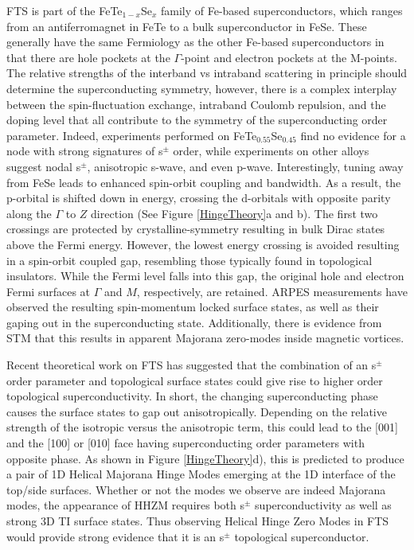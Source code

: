 \par
FTS is part of the FeTe$_{1-x}$Se$_{x}$ family of Fe-based superconductors, which ranges from an antiferromagnet in FeTe to a bulk superconductor in FeSe\cite{Liu2010}. These generally have the same Fermiology as the other Fe-based superconductors in that there are hole pockets at the $\Gamma$-point and electron pockets at the M-points\cite{Homes2015,Hanaguri2010,Miao2012,Okazaki2012,Zhang2018}. The relative strengths of the interband vs intraband scattering in principle should determine the superconducting symmetry, however, there is a complex interplay between the spin-fluctuation exchange, intraband Coulomb repulsion, and the doping level that all contribute to the symmetry of the superconducting order parameter\cite{Kreisel2016,Chubukov2012}. Indeed, experiments performed on FeTe$_{0.55}$Se$_{0.45}$ find no evidence for a node with strong signatures of s$^{\pm}$ order,\cite{Hanaguri2010,Miao2012,Zeng2010} while experiments on other alloys suggest nodal s$^{\pm}$, anisotropic s-wave, and even p-wave\cite{Michioka2010,Serafin2010,Bendele2010,Kim2010,Okazaki2012}. Interestingly, tuning away from FeSe leads to enhanced spin-orbit coupling and bandwidth. As a result, the p-orbital is shifted down in energy, crossing the d-orbitals with opposite parity along the $\Gamma$ to $Z$ direction (See Figure \ref{HingeTheory}a and b). The first two crossings are protected by crystalline-symmetry resulting in bulk Dirac states above the Fermi energy. However, the lowest energy crossing is avoided resulting in a spin-orbit coupled gap, resembling those typically found in topological insulators\cite{Wang2015,Chen178}. While the Fermi level falls into this gap, the original hole and electron Fermi surfaces at $\Gamma$ and $M$, respectively, are retained\cite{Zhang2018,Wang2015}. ARPES measurements have observed the resulting spin-momentum locked surface states, as well as their gaping out in the superconducting state\cite{Zhang2018,Zhang20192}. Additionally, there is evidence from STM that this results in apparent Majorana zero-modes inside magnetic vortices\cite{Wang2018,Dong-LaiFeng2018,Machida2018}.
\par
Recent theoretical work on FTS has suggested that the combination of an s$^{\pm}$ order parameter and topological surface states could give rise to higher order topological superconductivity\cite{DasSarma2018}. In short, the changing superconducting phase causes the surface states to gap out anisotropically. Depending on the relative strength of the isotropic versus the anisotropic term, this could lead to the [001] and the [100] or [010] face having superconducting order parameters with opposite phase. As shown in Figure \ref{HingeTheory}d), this is predicted to produce a pair of 1D Helical Majorana Hinge Modes emerging at the 1D interface of the top/side surfaces\cite{DasSarma2018}. Whether or not the modes we observe are indeed Majorana modes, the appearance of HHZM requires both s$^{\pm}$ superconductivity as well as strong 3D TI surface states. Thus observing Helical Hinge Zero Modes in FTS would provide strong evidence that it is an s$^{\pm}$ topological superconductor.
